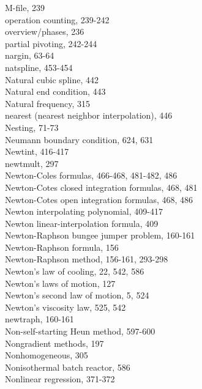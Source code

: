 \documentclass[../main.tex]{subfiles}
\begin{document}
\begin{multicols}{3}
    \hspace*{3mm}M-file, 239\\
    \hspace*{3mm}operation counting, 239-242\\
    \hspace*{3mm}overview/phases, 236\\
    \hspace*{3mm}partial pivoting, 242-244\\
    nargin, 63-64\\
    natspline, 453-454\\
    Natural cubic spline, 442\\
    Natural end condition, 443\\
    Natural frequency, 315\\
    nearest (nearest neighbor interpolation), 446\\
    Nesting, 71-73\\
    Neumann boundary condition, 624, 631\\
    Newtint, 416-417\\
    newtmult, 297\\
    Newton-Coles formulas, 466-468, 481-482, 486\\
    Newton-Cotes closed integration formulas, 468, 481\\
    Newton-Cotes open integration formulas, 468, 486\\
    Newton interpolating polynomial, 409-417\\
    Newton linear-interpolation formula, 409\\
    Newton-Raphson bungee jumper problem, 160-161\\
    Newton-Raphson formula, 156\\
    Newton-Raphson method, 156-161, 293-298\\
    Newton's law of cooling, 22, 542, 586\\
    Newton's laws of motion, 127\\
    Newton's second law of motion, 5, 524\\
    Newton's viscosity law, 525, 542\\
    newtraph, 160-161\\
    Non-self-starting Heun method, 597-600\\
    Nongradient methods, 197\\
    Nonhomogeneous, 305\\
    Nonisothermal batch reactor, 586\\
    Nonlinear regression, 371-372\\

\end{multicols}
\end{document}
